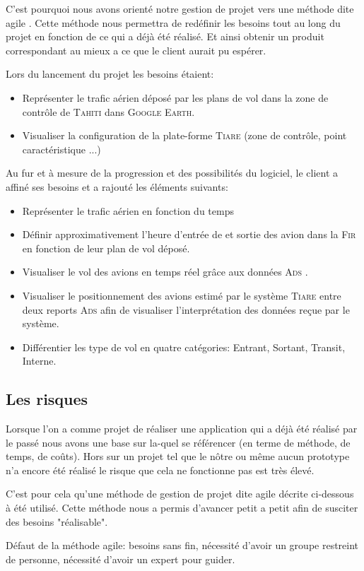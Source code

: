 C'est pourquoi nous avons orienté notre gestion de projet vers une méthode dite agile . Cette méthode nous permettra de redéfinir les besoins tout au long du projet en fonction de ce qui a déjà été réalisé. Et ainsi obtenir un produit correspondant au mieux a ce que le client aurait pu espérer.

Lors du lancement du projet les besoins étaient:
\begin{itemize}
    \item Représenter le trafic aérien déposé par les plans de vol dans la zone de contrôle de \textsc{Tahiti} dans \textsc{Google Earth}.
    \item Visualiser la configuration de la plate-forme \textsc{Tiare} (zone de contrôle, point caractéristique ...)
\end{itemize}\medskip

Au fur et à mesure de la progression et des possibilités du logiciel, le client a affiné ses besoins et a rajouté les éléments suivants:
\begin{itemize}
    \item Représenter le trafic aérien en fonction du temps
    \item Définir approximativement l'heure d'entrée de et sortie des avion dans la \textsc{Fir}  en fonction de leur plan de vol déposé.
    \item Visualiser le vol des avions en temps réel grâce aux données \textsc{Ads} .
    \item Visualiser le positionnement des avions estimé par le système \textsc{Tiare} entre deux reports \textsc{Ads} afin de visualiser l'interprétation des données reçue par le système.
    \item Différentier les type de vol en quatre catégories: Entrant, Sortant, Transit, Interne. 
\end{itemize}\medskip

    \subsection{Les risques}
Lorsque l'on a comme projet de réaliser une application qui a déjà été réalisé par le passé nous avons une base sur la-quel se référencer (en terme de méthode, de temps, de coûts). Hors sur un projet tel que le nôtre ou même aucun prototype n'a encore été réalisé le risque que cela ne fonctionne pas est très élevé.

C'est pour cela qu'une méthode de gestion de projet dite agile décrite ci-dessous  à été utilisé. Cette méthode nous a permis d'avancer petit a petit afin de susciter des besoins "réalisable". 

Défaut de la méthode agile: besoins sans fin, nécessité d'avoir un groupe restreint de personne, nécessité d’avoir un expert pour guider.









